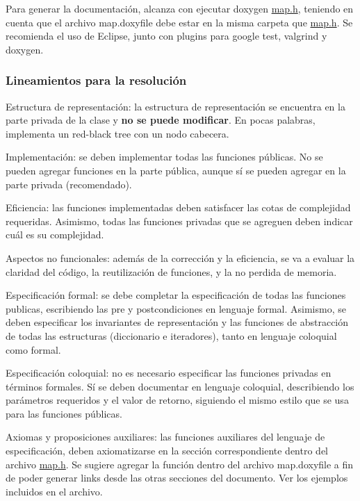 Para generar la documentación, alcanza con ejecutar {\ttfamily doxygen \hyperlink{map_8h}{map.\+h}}, teniendo en cuenta que el archivo {\ttfamily map.\+doxyfile} debe estar en la misma carpeta que {\ttfamily \hyperlink{map_8h}{map.\+h}}. Se recomienda el uso de Eclipse, junto con plugins para {\ttfamily google test}, {\ttfamily valgrind} y {\ttfamily doxygen}.\hypertarget{Enunciado_enun-lineamiento}{}\subsubsection{Lineamientos para la resolución}\label{Enunciado_enun-lineamiento}

\begin{DoxyItemize}
\item Estructura de representación\+: la estructura de representación se encuentra en la parte privada de la clase y {\bfseries no se puede modificar}. En pocas palabras, implementa un red-\/black tree con un nodo cabecera.
\item Implementación\+: se deben implementar todas las funciones públicas. No se pueden agregar funciones en la parte pública, aunque sí se pueden agregar en la parte privada (recomendado).
\item Eficiencia\+: las funciones implementadas deben satisfacer las cotas de complejidad requeridas. Asimismo, todas las funciones privadas que se agreguen deben indicar cuál es su complejidad.
\item Aspectos no funcionales\+: además de la corrección y la eficiencia, se va a evaluar la claridad del código, la reutilización de funciones, y la no perdida de memoria.
\item Especificación formal\+: se debe completar la especificación de todas las funciones publicas, escribiendo las pre y postcondiciones en lenguaje formal. Asimismo, se deben especificar los invariantes de representación y las funciones de abstracción de todas las estructuras (diccionario e iteradores), tanto en lenguaje coloquial como formal.
\item Especificación coloquial\+: no es necesario especificar las funciones privadas en términos formales. Sí se deben documentar en lenguaje coloquial, describiendo los parámetros requeridos y el valor de retorno, siguiendo el mismo estilo que se usa para las funciones públicas.
\item Axiomas y proposiciones auxiliares\+: las funciones auxiliares del lenguaje de especificación, deben axiomatizarse en la sección correspondiente dentro del archivo {\ttfamily \hyperlink{map_8h}{map.\+h}}. Se sugiere agregar la función dentro del archivo {\ttfamily map.\+doxyfile} a fin de poder generar links desde las otras secciones del documento. Ver los ejemplos incluidos en el archivo.

\end{DoxyItemize}
